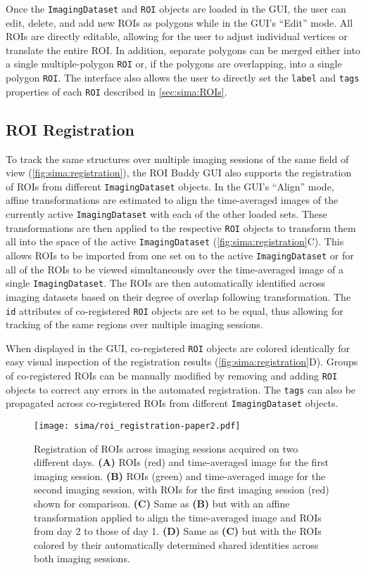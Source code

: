 Once the \verb|ImagingDataset| and \verb|ROI| objects are loaded in the GUI,
the user can edit, delete, and add new ROIs as polygons while in the GUI's ``Edit'' mode.
All ROIs are directly editable, allowing for the user to adjust individual vertices or translate the entire ROI.
In addition, separate polygons can be merged either into a single
multiple-polygon \verb|ROI| or, if the polygons are overlapping, into a single polygon \verb|ROI|.
The interface also allows the user to directly set the \verb|label| and \verb|tags|
properties of each \verb|ROI| described in \autoref{sec:sima:ROIs}.


\subsection{ROI Registration}
To track the same structures over multiple imaging sessions of the same field of view (\autoref{fig:sima:registration}),
the ROI Buddy GUI also supports the registration of ROIs from different \verb|ImagingDataset| objects.
In the GUI's ``Align'' mode, affine transformations are estimated to align the time-averaged images
of the currently active \verb|ImagingDataset| with each of the other loaded sets.
These transformations are then applied to the respective \verb|ROI| objects to transform them all into the space of the active \verb|ImagingDataset| (\autoref{fig:sima:registration}C).
This allows ROIs to be imported from one set on to the active \verb|ImagingDataset| or for
all of the ROIs to be viewed simultaneously over the time-averaged image of a single \verb|ImagingDataset|.
The ROIs are then automatically identified across imaging datasets based on their degree of overlap
following transformation.  The \verb|id| attributes of co-registered \verb|ROI| objects are set to be equal,
thus allowing for tracking of the same regions over multiple imaging sessions.

When displayed in the GUI, 
co-registered \verb|ROI| objects are colored identically for easy visual 
inspection of the registration results (\autoref{fig:sima:registration}D).
Groups of co-registered ROIs can be manually modified by removing and adding \verb|ROI| objects
to correct any errors in the automated registration.
The \verb|tags| can also be propagated across co-registered ROIs from different \verb|ImagingDataset| objects.

\begin{figure}[]
	\centering
	\texttt{[image: sima/roi\_registration-paper2.pdf]}
	\caption[Registration of ROIs across imaging sessions acquired on two different days]{Registration of ROIs across imaging sessions acquired on two different days.
	\textbf{(A)} ROIs (red) and time-averaged image for the first imaging session.
	\textbf{(B)} ROIs (green) and time-averaged image for the second imaging session, with ROIs for the first imaging session (red) shown for comparison.
	\textbf{(C)} Same as \textbf{(B)} but with an affine transformation applied to align the time-averaged image and ROIs from day 2 to those of day 1.
	\textbf{(D)} Same as \textbf{(C)} but with the ROIs colored by their automatically determined shared identities across both imaging sessions.}
	\label{fig:sima:registration}
\end{figure}


